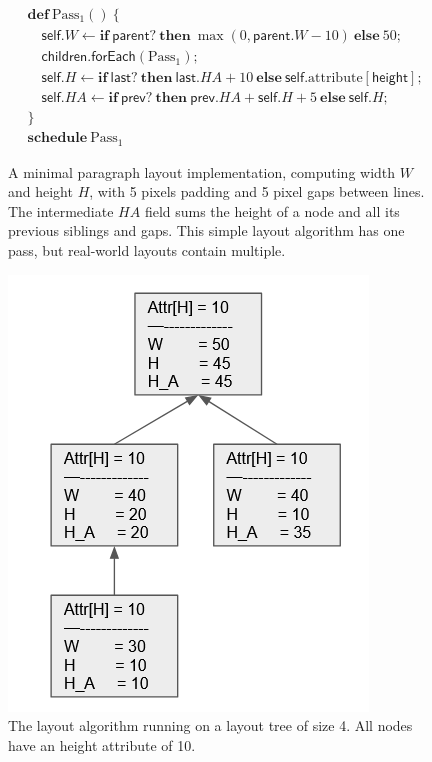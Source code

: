 \begin{figure}
\begin{minipage}[b]{0.68\linewidth}
\begin{align*}
& \mathbf{def}\:\text{Pass}_1()\:\{ \\
& \quad \mathsf{self}.W \gets
        \mathbf{if}\:\mathsf{parent}?\:
        \mathbf{then}\:\operatorname{max}(0, \mathsf{parent}.W - 10)\:
        \mathbf{else}\:50; \\
& \quad \mathsf{children}.\mathsf{forEach}(\text{Pass}_1); \\
& \quad \mathsf{self}.H \gets
        \mathbf{if}\:\mathsf{last}?\:
        \mathbf{then}\:\mathsf{last}.HA + 10\:
        \mathbf{else}\:\mathsf{self}.\text{attribute}[\mathsf{height}]; \\
& \quad \mathsf{self}.HA \gets
        \mathbf{if}\:\mathsf{prev}?\:
        \mathbf{then}\:\mathsf{prev}.HA + \mathsf{self}.H + 5\:
        \mathbf{else}\:\mathsf{self}.H; \\
& \} \\
& \mathbf{schedule}\:\text{Pass}_1
\end{align*}
\caption{
  A minimal paragraph layout implementation,
    computing width $W$ and height $H$,
    with 5 pixels padding and 5 pixel gaps between lines.
  The intermediate $HA$ field sums the height
    of a node and all its previous siblings and gaps.
  This simple layout algorithm has one pass,
    but real-world layouts contain multiple.
}
\label{fig:layout-simple}
\end{minipage}\hfill%
\begin{minipage}[b]{0.28\linewidth}
\centering
\includegraphics[scale=0.23]{LayoutExample.png}
\caption{The layout algorithm running on a layout tree of size 4. All nodes have an height attribute of 10.
}
\end{minipage}
\end{figure}
